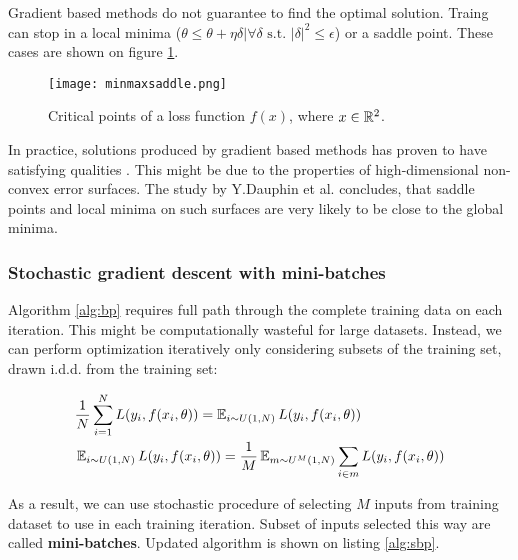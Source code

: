 

Gradient based methods do not guarantee to find the optimal solution.
Traing can stop in a local minima ($\theta \leq \theta + \eta \delta | \forall \delta \text{ s.t. } |\delta|^2 \leq \epsilon$) or a saddle point.
These cases are shown on figure \ref{fig:critical}.

\begin{figure}[h!]
  \centering
    \texttt{[image: minmaxsaddle.png]}
  \caption{Critical points of a loss function $f(x)$, where $x \in \Bbb{R}^2$.}
  \label{fig:critical}
\end{figure}

In practice, solutions produced by gradient based methods has proven to have satisfying qualities \cite{Szegedy2016,He2015}.
This might be due to the properties of high-dimensional non-convex error surfaces. The study by Y.Dauphin et al. \cite{Dauphin14} concludes, that saddle points and local minima on such surfaces are very likely to be close to the global minima.

\subsubsection{Stochastic gradient descent with mini-batches}

Algorithm \ref{alg:bp} requires full path through the complete training data on each iteration.
This might be computationally wasteful for large datasets. Instead, we can perform optimization iteratively only considering subsets of the training set, drawn i.d.d. from the training set:

\begin{equation*}\label{eq:sopt}
  \begin{aligned}
  & \frac{1}{N} \sum_{i=1}^{N} L(y_i, f(x_i, \theta)) = \operatorname{\mathbb{E}}_{i \sim U(1,N) } L(y_i, f(x_i, \theta)) \\
  & \operatorname{\mathbb{E}}_{i \sim U(1,N) } L(y_i, f(x_i, \theta))= \frac{1}{M} \operatorname{\mathbb{E}}_{m \sim U^M(1,N) } \sum_{i \in m} L(y_i, f(x_i, \theta))
  \end{aligned}
\end{equation*}

As a result, we can use stochastic procedure of selecting $M$ inputs from training dataset to use in each training iteration.
Subset of inputs selected this way are called \textbf{mini-batches}. Updated algorithm is shown on listing \ref{alg:sbp}.



